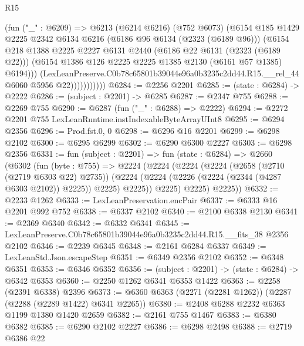\begin{lexlean}{R15}
\begin{coremodule}
                      (fun ("_" : @6209) =>
                      @6213
                        (@6214 @6216)
                        (@752 @6073)
                        (@6154
                          @185
                          @1429
                          @2225
                          @2342
                          @6134
                          @6216
                          (@6186 @96 @6134 (@2323 (@6189 @96)))
                          (@6154
                            @218
                            @1388
                            @2225
                            @2227
                            @6131
                            @2440
                            (@6186 @22 @6131 (@2323 (@6189 @22)))
                            (@6154 @1386 @126 @2225 @2225 @1385 @2130 (@6161 @57 @1385) @6194)))
                        (LexLeanPreserve.C0b78c65801b39044e96a0b3235c2dd44.R15.__rel_44
                          @6060
                          @5956
                          @22)))))))))))
@6284 := @2256 @2201
@6285 := (state : @6284) -> @2222
@6286 := (subject : @2201) -> @6285
@6287 := @2347 @755
@6288 := @2269 @755
@6290 := @6287 (fun ("_" : @6288) => @2222)
@6294 := @2272 @2201 @755 LexLeanRuntime.instIndexableByteArrayUInt8
@6295 := @6294 @2356
@6296 := Prod.fst.{0, 0}
@6298 := @6296 @16 @2201
@6299 := @6298 @2102
@6300 := @6295 @6299
@6302 := @6290 @6300 @2227
@6303 := @6298 @2356
@6331 := fun (subject : @2201) =>
  fun (state : @6284) =>
  @2660
    (@6302
      (fun (byte : @755) =>
      @2224
        (@2224
          (@2224
            (@2224
              (@2658 (@2710 (@2719 @6303 @22) @2735))
              (@2224 (@2224 (@2226 (@2224 (@2344 (@4287 @6303 @2102)) @2225)) @2225) @2225))
            @2225)
          @2225)
        @2225))
@6332 := @2233 @1262
@6333 := LexLeanPreservation.encPair
@6337 := @6333 @16 @2201 @992 @752
@6338 := @6337 @2102
@6340 := @2100 @6338 @2130
@6341 := @2369 @6340
@6342 := @6332 @6341
@6345 := LexLeanPreserve.C0b78c65801b39044e96a0b3235c2dd44.R15.__fits_38 @2356 @2102
@6346 := @2239 @6345
@6348 := @2161 @6284 @6337
@6349 := LexLeanStd.Json.escapeStep
@6351 := @6349 @2356 @2102
@6352 := @6348 @6351
@6353 := @6346 @6352
@6356 := (subject : @2201) -> (state : @6284) -> @6342 @6353
@6360 := @2250 @1262 @6341 @6353 @1422
@6363 := @2258 (@2391 @6338) @2396
@6373 := @6360 @6363 (@2271 (@2281 @1262)) (@2287 (@2288 (@2289 @1422) @6341 @2265))
@6380 := @2408 @6288 @2232 @6363 @1199 @1380 @1420 @2659
@6382 := @2161 @755 @1467
@6383 := @6380 @6382
@6385 := @6290 @2102 @2227
@6386 := @6298 @2498
@6388 := @2719 @6386 @22

\end{coremodule}
\end{lexlean}
